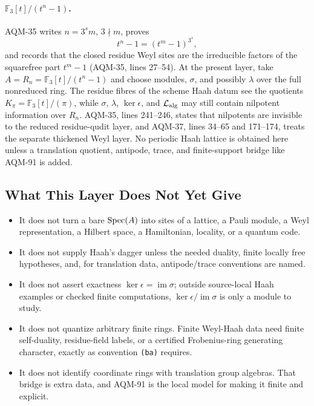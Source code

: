 \paragraph{\(\mathbb F_3[t]/(t^n-1)\).}
AQM-35 writes \(n=3^s m\), \(3\nmid m\), proves
\[
  t^n-1=(t^m-1)^{3^s},
\]
and records that the closed residue Weyl sites are the irreducible factors of
the squarefree part \(t^m-1\) (AQM-35, lines 27--54).  At the present layer,
take \(A=R_n=\mathbb F_3[t]/(t^n-1)\) and choose modules, \(\sigma\), and
possibly \(\lambda\) over the full nonreduced ring.  The residue fibres of the
scheme Haah datum see the quotients \(K_\pi=\mathbb F_3[t]/(\pi)\), while
\(\sigma\), \(\lambda\), \(\ker\epsilon\), and
\(\mathcal L_{\rm alg}\) may still contain nilpotent information over \(R_n\).
AQM-35, lines 241--246, states that nilpotents are invisible to the reduced
residue-qudit layer, and AQM-37, lines 34--65 and 171--174, treats the
separate thickened Weyl layer.  No periodic Haah lattice is obtained here
unless a translation quotient, antipode, trace, and finite-support bridge like
AQM-91 is added.

\subsection{What This Layer Does Not Yet Give}

\begin{itemize}
\item It does not turn a bare \(\operatorname{Spec}(A)\) into sites of a lattice, a Pauli module, a Weyl representation, a Hilbert space, a Hamiltonian, locality, or a quantum code.
\item It does not supply Haah's dagger unless the needed duality, finite locally free hypotheses, and, for translation data, antipode/trace conventions are named.
\item It does not assert exactness \(\ker\epsilon=\operatorname{im}\sigma\); outside source-local Haah examples or checked finite computations, \(\ker\epsilon/\operatorname{im}\sigma\) is only a module to study.
\item It does not quantize arbitrary finite rings.  Finite Weyl-Haah data need finite self-duality, residue-field labels, or a certified Frobenius-ring generating character, exactly as convention \texttt{(ba)} requires.
\item It does not identify coordinate rings with translation group algebras.  That bridge is extra data, and AQM-91 is the local model for making it finite and explicit.
\end{itemize}
